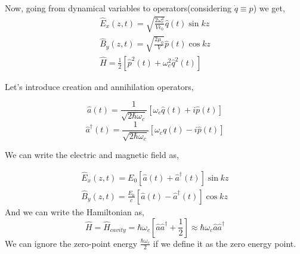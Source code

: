 \documentclass{article}
\numberwithin{equation}{section}
\begin{document}
Now, going from dynamical variables to operators(considering $\dot{q} \equiv p$) we get,
\begin{equation}
    \begin{split}
         \hat{E}_x(z, t) = \sqrt{\frac{2 \omega_c^2}{V \epsilon_0}}\hat{q}(t)\sin{kz} \\
         \hat{B}_y(z, t) = \sqrt{\frac{2 \mu_0}{V}}\hat{p}(t)\cos{kz} \\
         \hat{H} = \frac{1}{2}[\hat{p}^2(t) + \omega_c^2 \hat{q}^2(t)]
    \end{split}
\end{equation}

Let’s introduce creation and annihilation operators,

$$\hat{a}(t) = \frac{1}{\sqrt{2\hbar\omega_c}}[\omega_c\hat{q}(t) + i\hat{p}(t)]$$
$$\hat{a}^\dag(t) = \frac{1}{\sqrt{2\hbar\omega_c}}[\omega_c\hat{q}(t) - i\hat{p}(t)]$$

We can write the electric and magnetic field as,

\begin{equation}
    \begin{split}
         \hat{E}_x(z, t) = E_0[\hat{a}(t) + \hat{a}^\dag(t)]\sin{kz} \\
         \hat{B}_y(z, t) = \frac{E_0}{c}[\hat{a}(t) - \hat{a}^\dag(t)]\cos{kz}
    \end{split}
\end{equation}
And we can write the Hamiltonian as,
\begin{equation}
    \hat{H} = \hat{H}_{cavity} = \hbar\omega_c[\hat{a}\hat{a}^\dag + \frac{1}{2}] \approx \hbar\omega_c\hat{a}\hat{a}^\dag
\end{equation}
We can ignore the zero-point energy $\frac{\hbar\omega_c}{2}$ if we define it as the zero energy point.
\end{document}
